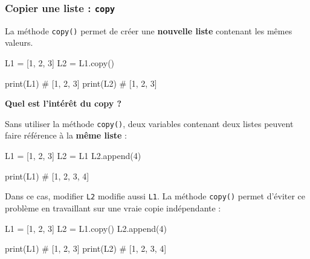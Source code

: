 \documentclass[11pt]{article}
\begin{document}
	\medskip
	
	\subsubsection*{Copier une liste : \texttt{copy}}
	
	La méthode \texttt{copy()} permet de créer une \textbf{nouvelle liste}
	contenant les mêmes valeurs.
	
	\begin{python}
	L1 = [1, 2, 3]
	L2 = L1.copy()
	
	print(L1)  # [1, 2, 3]
	print(L2)  # [1, 2, 3]\end{python}
	
	\bigskip
	
	\textbf{Quel est l'intérêt du copy ?}
	
	\medskip
	
	Sans utiliser la méthode \texttt{copy()}, deux variables contenant deux listes peuvent faire référence à la \textbf{même liste} :
	
	\begin{python}
	L1 = [1, 2, 3]
	L2 = L1
	L2.append(4)
	
	print(L1)  # [1, 2, 3, 4]\end{python}
	
	\medskip
	
	Dans ce cas, modifier \texttt{L2} modifie aussi \texttt{L1}.  
	La méthode \texttt{copy()} permet d’éviter ce problème en travaillant
	sur une vraie copie indépendante :
	
		\begin{python}
		L1 = [1, 2, 3]
		L2 = L1.copy()
		L2.append(4)
		
		print(L1)  # [1, 2, 3]
		print(L2)  # [1, 2, 3, 4]\end{python}
		
		
\end{document}
